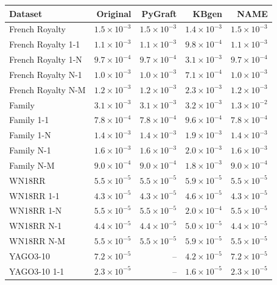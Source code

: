 \begin{tabular}{lrrrr}
\toprule
Dataset & Original & PyGraft & KBgen & NAME \\
\midrule
French Royalty & $1.5\times10^{-3}$ & $1.5\times10^{-3}$ & $1.4\times10^{-3}$ & $1.5\times10^{-3}$ \\
French Royalty 1-1 & $1.1\times10^{-3}$ & $1.1\times10^{-3}$ & $9.8\times10^{-4}$ & $1.1\times10^{-3}$ \\
French Royalty 1-N & $9.7\times10^{-4}$ & $9.7\times10^{-4}$ & $3.1\times10^{-3}$ & $9.7\times10^{-4}$ \\
French Royalty N-1 & $1.0\times10^{-3}$ & $1.0\times10^{-3}$ & $7.1\times10^{-4}$ & $1.0\times10^{-3}$ \\
French Royalty N-M & $1.2\times10^{-3}$ & $1.2\times10^{-3}$ & $2.3\times10^{-3}$ & $1.2\times10^{-3}$ \\
\midrule
Family & $3.1\times10^{-3}$ & $3.1\times10^{-3}$ & $3.2\times10^{-3}$ & $1.3\times10^{-2}$ \\
Family 1-1 & $7.8\times10^{-4}$ & $7.8\times10^{-4}$ & $9.6\times10^{-4}$ & $7.8\times10^{-4}$ \\
Family 1-N & $1.4\times10^{-3}$ & $1.4\times10^{-3}$ & $1.9\times10^{-3}$ & $1.4\times10^{-3}$ \\
Family N-1 & $1.6\times10^{-3}$ & $1.6\times10^{-3}$ & $2.0\times10^{-3}$ & $1.6\times10^{-3}$ \\
Family N-M & $9.0\times10^{-4}$ & $9.0\times10^{-4}$ & $1.8\times10^{-3}$ & $9.0\times10^{-4}$ \\
\midrule
WN18RR & $5.5\times10^{-5}$ & $5.5\times10^{-5}$ & $5.9\times10^{-5}$ & $5.5\times10^{-5}$ \\
WN18RR 1-1 & $4.3\times10^{-5}$ & $4.3\times10^{-5}$ & $4.6\times10^{-5}$ & $4.3\times10^{-5}$ \\
WN18RR 1-N & $5.5\times10^{-5}$ & $5.5\times10^{-5}$ & $2.0\times10^{-4}$ & $5.5\times10^{-5}$ \\
WN18RR N-1 & $4.4\times10^{-5}$ & $4.4\times10^{-5}$ & $5.0\times10^{-5}$ & $4.4\times10^{-5}$ \\
WN18RR N-M & $5.5\times10^{-5}$ & $5.5\times10^{-5}$ & $5.9\times10^{-5}$ & $5.5\times10^{-5}$ \\
\midrule
YAGO3-10 & $7.2\times10^{-5}$ & – & $4.2\times10^{-5}$ & $7.2\times10^{-5}$ \\
YAGO3-10 1-1 & $2.3\times10^{-5}$ & – & $1.6\times10^{-5}$ & $2.3\times10^{-5}$ \\

\end{tabular}
